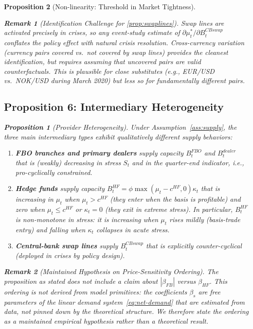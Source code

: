 \documentclass[12pt]{article}
\newtheorem{proposition}{Proposition}
\newtheorem{remark}{Remark}
\theoremstyle{definition}
\newcommand{\1}[1]{\mathds{1}\left[#1\right]}
\begin{document}
\begin{proposition}[Non-linearity: Threshold in Market Tightness]
\begin{remark}[Identification Challenge for \cref{prop:swaplines}]
  Swap lines are activated precisely in crises, so any event-study estimate of
  $\partial\mu_t^*/\partial B_t^{CBswap}$ conflates the policy effect with
  natural crisis resolution. Cross-currency variation (currency pairs covered
  vs.\ not covered by swap lines) provides the cleanest identification, but
  requires assuming that uncovered pairs are valid counterfactuals. This is
  plausible for close substitutes (e.g., EUR/USD vs.\ NOK/USD during
  March 2020) but less so for fundamentally different pairs.
\end{remark}

\subsection{Proposition 6: Intermediary Heterogeneity}

\begin{proposition}[Provider Heterogeneity]
  \label{prop:heterogeneity}
  Under Assumption~\ref{ass:supply}, the three main intermediary types exhibit
  qualitatively different supply behaviors:
  \begin{enumerate}[label=(\alph*)]
    \item \textbf{FBO branches and primary dealers} supply capacity $B_t^{FBO}$
    and $B_t^{dealer}$ that is (weakly) decreasing in stress $S_t$ and in the
    quarter-end indicator, i.e., pro-cyclically constrained.
    \item \textbf{Hedge funds} supply capacity $B_t^{HF} = \phi\max(\mu_t -
    c^{HF},0)\kappa_t$ that is increasing in $\mu_t$ when $\mu_t > c^{HF}$
    (they enter when the basis is profitable) and zero when $\mu_t \leq c^{HF}$
    or $\kappa_t = 0$ (they exit in extreme stress). In particular, $B_t^{HF}$
    is non-monotone in stress: it is increasing when $\mu_t$ rises mildly
    (basis-trade entry) and falling when $\kappa_t$ collapses in acute stress.
    \item \textbf{Central-bank swap lines} supply $B_t^{CBswap}$ that is
    explicitly counter-cyclical (deployed in crises by policy design).
  \end{enumerate}
\end{proposition}

\begin{remark}[Maintained Hypothesis on Price-Sensitivity Ordering]
  \label{rem:beta-ordering}
  The proposition as stated does not include a claim about $|\beta_{FB}|$
  versus $\beta_{HF}$. This ordering is \emph{not} derived from model
  primitives: the coefficients $\beta_s$ are free parameters of the linear
  demand system~\eqref{eq:net-demand} that are estimated from data, not
  pinned down by the theoretical structure. We therefore state the ordering
  as a maintained empirical hypothesis rather than a theoretical result.


\end{remark}
\end{proposition}
\end{document}
